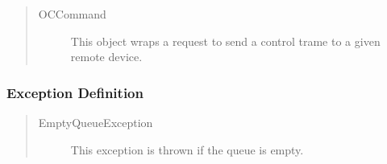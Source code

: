 \begin{quote}
	\begin{description}
		\item[OCCommand] This object wraps a request to send a control trame to a
		given remote device.
	\end{description} 
\end{quote}

\subsubsection{Exception Definition}

\begin{quote}
	\begin{description}
		\item[EmptyQueueException] This exception is thrown if the queue is empty.
	\end{description} 
\end{quote}

